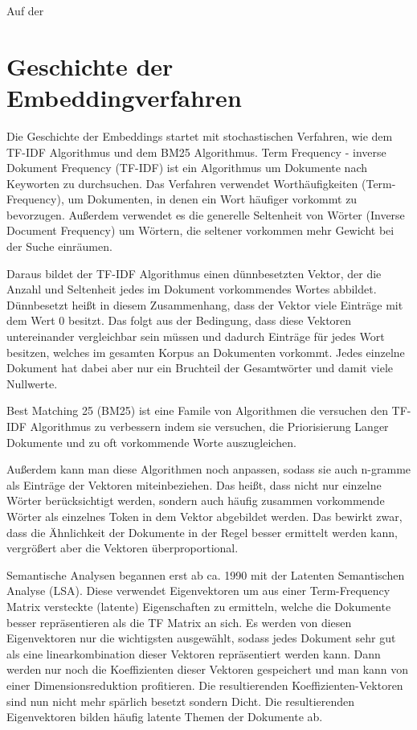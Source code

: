 Auf der 

\section{Geschichte der Embeddingverfahren}

Die Geschichte der Embeddings startet mit stochastischen Verfahren, wie dem TF-IDF Algorithmus und dem BM25 Algorithmus. 
Term Frequency - inverse Dokument Frequency (TF-IDF) ist ein Algorithmus um Dokumente nach Keyworten zu durchsuchen.
Das Verfahren verwendet Worthäufigkeiten (Term-Frequency), um Dokumenten, in denen ein Wort häufiger vorkommt zu bevorzugen.
Außerdem verwendet es die generelle Seltenheit von Wörter (Inverse Document Frequency) um Wörtern, die seltener vorkommen mehr Gewicht bei der Suche einräumen.

Daraus bildet der TF-IDF Algorithmus einen dünnbesetzten Vektor, der die Anzahl und Seltenheit jedes im Dokument vorkommendes Wortes abbildet. 
Dünnbesetzt heißt in diesem Zusammenhang, dass der Vektor viele Einträge mit dem Wert 0 besitzt. 
Das folgt aus der Bedingung, dass diese Vektoren untereinander vergleichbar sein müssen und dadurch Einträge für jedes Wort besitzen, welches im gesamten Korpus an Dokumenten vorkommt.
Jedes einzelne Dokument hat dabei aber nur ein Bruchteil der Gesamtwörter und damit viele Nullwerte.

Best Matching 25 (BM25) ist eine Famile von Algorithmen die versuchen den TF-IDF Algorithmus zu verbessern indem sie versuchen, die Priorisierung Langer Dokumente und zu oft vorkommende Worte auszugleichen.

Außerdem kann man diese Algorithmen noch anpassen, sodass sie auch n-gramme als Einträge der Vektoren miteinbeziehen. 
Das heißt, dass nicht nur einzelne Wörter berücksichtigt werden, sondern auch häufig zusammen vorkommende Wörter als einzelnes Token in dem Vektor abgebildet werden. 
Das bewirkt zwar, dass die Ähnlichkeit der Dokumente in der Regel besser ermittelt werden kann, vergrößert aber die Vektoren überproportional.

Semantische Analysen begannen erst ab ca. 1990 mit der Latenten Semantischen Analyse (LSA).
Diese verwendet Eigenvektoren um aus einer Term-Frequency Matrix versteckte (latente) Eigenschaften zu ermitteln, welche die Dokumente besser repräsentieren als die TF Matrix an sich. 
Es werden von diesen Eigenvektoren nur die wichtigsten ausgewählt, sodass jedes Dokument sehr gut als eine linearkombination dieser Vektoren repräsentiert werden kann.
Dann werden nur noch die Koeffizienten dieser Vektoren gespeichert und man kann von einer Dimensionsreduktion profitieren.
Die resultierenden Koeffizienten-Vektoren sind nun nicht mehr spärlich besetzt sondern Dicht.
Die resultierenden Eigenvektoren bilden häufig latente Themen der Dokumente ab.

